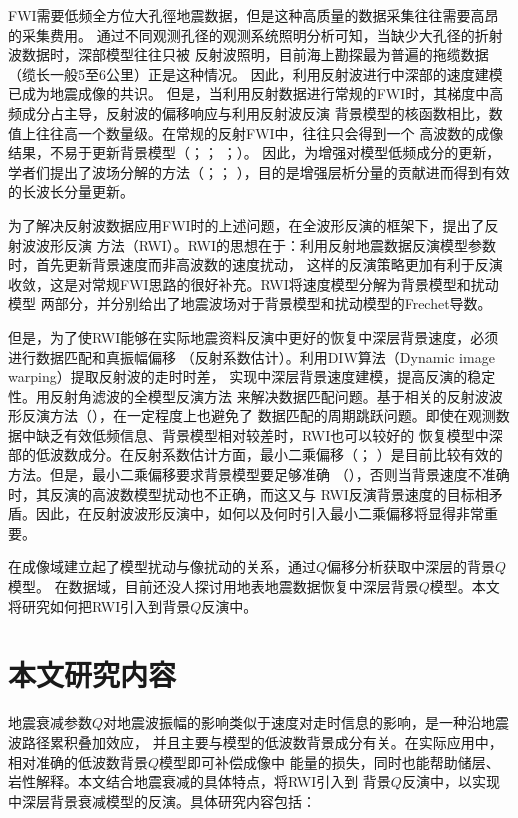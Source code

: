 FWI需要低频全方位大孔徑地震数据，但是这种高质量的数据采集往往需要高昂的采集费用。
通过不同观测孔径的观测系统照明分析可知，当缺少大孔径的折射波数据时，深部模型往往只被
反射波照明，目前海上勘探最为普遍的拖缆数据（缆长一般5至6公里）正是这种情况。
因此，利用反射波进行中深部的速度建模已成为地震成像的共识。
但是，当利用反射数据进行常规的FWI时，其梯度中高频成分占主导，反射波的偏移响应与利用反射波反演
背景模型的核函数相比，数值上往往高一个数量级。在常规的反射FWI中，往往只会得到一个
高波数的成像结果，不易于更新背景模型（；；
；）。
因此，为增强对模型低频成分的更新，学者们提出了波场分解的方法（；；
），目的是增强层析分量的贡献进而得到有效的长波长分量更新。

为了解决反射波数据应用FWI时的上述问题，在全波形反演的框架下，提出了反射波波形反演
方法（RWI）。RWI的思想在于：利用反射地震数据反演模型参数时，首先更新背景速度而非高波数的速度扰动，
这样的反演策略更加有利于反演收敛，这是对常规FWI思路的很好补充。RWI将速度模型分解为背景模型和扰动模型
两部分，并分别给出了地震波场对于背景模型和扰动模型的Frechet导数。

但是，为了使RWI能够在实际地震资料反演中更好的恢复中深层背景速度，必须进行数据匹配和真振幅偏移
（反射系数估计）。利用DIW算法（Dynamic image warping）提取反射波的走时时差，
实现中深层背景速度建模，提高反演的稳定性。用反射角滤波的全模型反演方法
来解决数据匹配问题。基于相关的反射波波形反演方法（），在一定程度上也避免了
数据匹配的周期跳跃问题。即使在观测数据中缺乏有效低频信息、背景模型相对较差时，RWI也可以较好的
恢复模型中深部的低波数成分。在反射系数估计方面，最小二乘偏移（；
）是目前比较有效的方法。但是，最小二乘偏移要求背景模型要足够准确
（），否则当背景速度不准确时，其反演的高波数模型扰动也不正确，而这又与
RWI反演背景速度的目标相矛盾。因此，在反射波波形反演中，如何以及何时引入最小二乘偏移将显得非常重要。

在成像域建立起了模型扰动与像扰动的关系，通过$Q$偏移分析获取中深层的背景$Q$模型。
在数据域，目前还没人探讨用地表地震数据恢复中深层背景$Q$模型。本文将研究如何把RWI引入到背景$Q$反演中。

\newpage
\section{本文研究内容}

地震衰减参数$Q$对地震波振幅的影响类似于速度对走时信息的影响，是一种沿地震波路径累积叠加效应，
并且主要与模型的低波数背景成分有关。在实际应用中，相对准确的低波数背景$Q$模型即可补偿成像中
能量的损失，同时也能帮助储层、岩性解释。本文结合地震衰减的具体特点，将RWI引入到
背景$Q$反演中，以实现中深层背景衰减模型的反演。具体研究内容包括：


